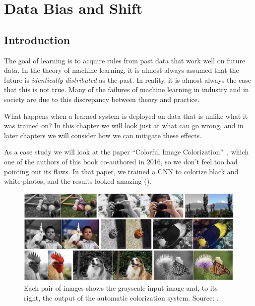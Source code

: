 
\chapter{Data Bias and Shift}
\label{chapter:bias_and_shift}

\section{Introduction}

The goal of learning is to acquire rules from past data that work well on future data. In the theory of machine learning, it is almost always assumed that the future is \textit{identically distributed} as the past. In reality, it is almost always the case that this is not true. Many of the failures of machine learning in industry and in society are due to this discrepancy between theory and practice.

What happens when a learned system is deployed on data that is unlike what it was trained on? In this chapter we will look just at what can go wrong, and in later chapters we will consider how we can mitigate these effects.

As a case study we will look at the paper ``Colorful Image Colorization''~\cite{zhang2016colorful}, which one of the authors of this book co-authored in 2016, so we don't feel too bad pointing out its flaws. In that paper, we trained a CNN to colorize black and white photos, and the results looked amazing (\fig{\ref{fig:bias_and_shift:CIC_teaser}}).
\begin{figure}[h!]
    \centerline{
    \includegraphics[width=1.0\linewidth]{./figures/bias_and_shift/CIC_teaser_v5.jpg}
    }
    \caption{Each pair of images shows the grayscale input image and, to its right, the output of the automatic colorization system. Source: \cite{zhang2016colorful}.}
    \label{fig:bias_and_shift:CIC_teaser}
\end{figure}

